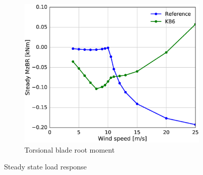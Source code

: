 \begin{figure}[tph]
\begin{subfigure}{\textwidth}
\centering
\includegraphics[width=0.50\linewidth]{figures/KB6_final/KB6_steady_MzBR_HS2.eps}
\caption{Torsional blade root moment}
\label{subfig:Mz}
\end{subfigure}
 
\caption{Steady state load response}
\label{fig:KB6_load_response}
\end{figure}

